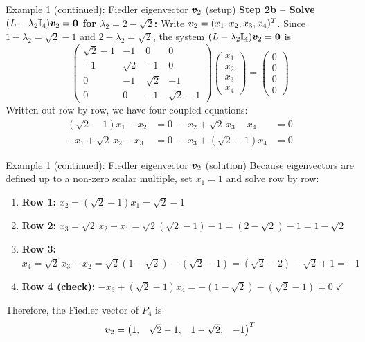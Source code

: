 \documentclass[aspectratio=169]{beamer}\usepackage[]{graphicx}\usepackage[]{xcolor}
\begin{document}
\begin{frame}{Example 1 (continued): Fiedler eigenvector $\bm{v}_2$ (setup)}
\textbf{Step 2b -- Solve $(L - \lambda_2 \II_4)\bv_2 = \b0$ for $\lambda_2 = 2 - \sqrt{2}$:}
\vfill
Write $\bm{v}_2 = (x_1, x_2, x_3, x_4)^T$.
Since $1 - \lambda_2 = \sqrt{2} - 1$ and $2 - \lambda_2 = \sqrt{2}$, the system $(L - \lambda_2 \II_4)\bv_2 = \b0$ is
\[
\begin{pmatrix}
\sqrt{2} - 1 & -1 & 0 & 0 \\
-1 & \sqrt{2} & -1 & 0 \\
0 & -1 & \sqrt{2} & -1 \\
0 & 0 & -1 & \sqrt{2} - 1
\end{pmatrix}
\begin{pmatrix} x_1 \\ x_2 \\ x_3 \\ x_4 \end{pmatrix}
= \begin{pmatrix} 0 \\ 0 \\ 0 \\ 0 \end{pmatrix}
\]
\vfill
Written out row by row, we have four coupled equations:
\begin{align*}
(\sqrt{2} - 1)x_1 - x_2 &= 0 & -x_2 + \sqrt{2}\,x_3 - x_4 &= 0 \\
-x_1 + \sqrt{2}\,x_2 - x_3 &= 0 & -x_3 + (\sqrt{2} - 1)x_4 &= 0
\end{align*}
\end{frame}


\begin{frame}{Example 1 (continued): Fiedler eigenvector $\bm{v}_2$ (solution)}
Because eigenvectors are defined up to a non-zero scalar multiple, set $x_1 = 1$ and solve row by row:
\vfill
\begin{enumerate}
\item \textbf{Row 1:} $x_2 = (\sqrt{2} - 1)x_1 = \sqrt{2} - 1$
\vfill
\item \textbf{Row 2:} $x_3 = \sqrt{2}\,x_2 - x_1 = \sqrt{2}(\sqrt{2} - 1) - 1 = (2 - \sqrt{2}) - 1 = 1 - \sqrt{2}$
\vfill
\item \textbf{Row 3:} $x_4 = \sqrt{2}\,x_3 - x_2 = \sqrt{2}(1 - \sqrt{2}) - (\sqrt{2} - 1) = (\sqrt{2} - 2) - \sqrt{2} + 1 = -1$
\vfill
\item \textbf{Row 4 (check):} $-x_3 + (\sqrt{2} - 1)x_4 = -(1 - \sqrt{2}) - (\sqrt{2} - 1) = 0 \;\checkmark$
\end{enumerate}
\vfill
Therefore, the Fiedler vector of $P_4$ is
\[
\bm{v}_2 = \begin{pmatrix} 1, & \sqrt{2}-1, & 1-\sqrt{2}, & -1 \end{pmatrix}^T
\]
\end{frame}
\end{document}
